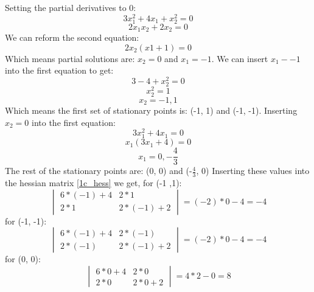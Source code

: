 \documentclass{article}
\begin{document}
Setting the partial derivatives to 0:
\begin{equation*}
    3x_1^2 + 4x_1 + x_2^2 = 0
\end{equation*}
\begin{equation*}
    2x_1x_2 + 2x_2 = 0
\end{equation*}
We can reform the second equation:
\begin{equation*}
    2x_2(x1 + 1) = 0
\end{equation*}
Which means partial solutions are: $x_2 = 0$ and $x_1 = -1$. We can insert $x_1 - -1$ into the first equation to get:
\begin{equation*}
    3 - 4 + x_2^2 = 0
\end{equation*}
\begin{equation*}
    x_2^2 = 1
\end{equation*}
\begin{equation*}
    x_2 = -1, 1
\end{equation*}
Which means the first set of stationary points is: (-1, 1) and (-1, -1). Inserting $x_2 = 0$ into the first equation:
\begin{equation*}
    3x_1^2 + 4x_1 = 0
\end{equation*}
\begin{equation*}
    x_1(3x_1 + 4) = 0
\end{equation*}
\begin{equation*}
    x_1 = 0, -\frac{4}{3}
\end{equation*}
The rest of the stationary points are: (0, 0) and (-$\frac{4}{3}$, 0)
Inserting these values into the hessian matrix \eqref{1c_hess} we get, for (-1 ,1):
\begin{equation*}
    \begin{vmatrix}
        6*(-1) + 4 & 2*1 \\ 2*1 & 2*(-1) + 2
    \end{vmatrix} = (-2)*0 - 4 = -4
\end{equation*}
for (-1, -1):
\begin{equation*}
    \begin{vmatrix}
        6*(-1) + 4 & 2*(-1) \\ 2*(-1) & 2*(-1) + 2
    \end{vmatrix} = (-2)*0 - 4 = -4
\end{equation*}
for (0, 0):
\begin{equation*}
    \begin{vmatrix}
        6*0 + 4 & 2*0 \\ 2*0 & 2*0 + 2
    \end{vmatrix} = 4 * 2 - 0 = 8
\end{equation*}
\end{document}
